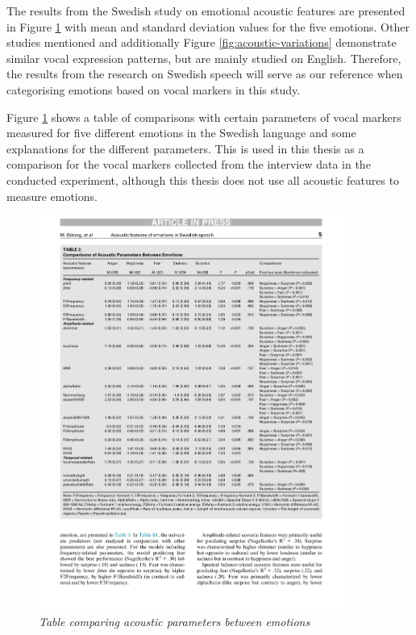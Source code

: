 The results from the Swedish study \autocite{Ekberg2023} on emotional acoustic features are presented in Figure \ref{fig:compare-acoustic-parameters} with mean and standard deviation values for the five emotions. Other studies mentioned \autocites{Banse1996}{Kamilolu2020}{Scherer2003} and additionally Figure \ref{fig:acoustic-variations} \autocite{Khalil2019} demonstrate similar vocal expression patterns, but are mainly studied on English. 
Therefore, the results from the research on Swedish speech will serve as our reference when categorising emotions based on vocal markers in this study. 

 Figure \ref{fig:compare-acoustic-parameters} \autocite{Ekberg2023} shows a table of comparisons with certain parameters of vocal markers measured for five different emotions in the Swedish language and some explanations for the different parameters. This is used in this thesis as a comparison for the vocal markers collected from the interview data in the conducted experiment, although this thesis does not use all acoustic features to measure emotions.
 
\clearpage
\begin{figure}[H]
    \centering
    \includegraphics[width=10cm]{png/theoretical/table-acoustic.pdf}
    \caption{\textit{Table comparing acoustic parameters between emotions} \autocite{Ekberg2023}}
    \label{fig:compare-acoustic-parameters}
\end{figure}

